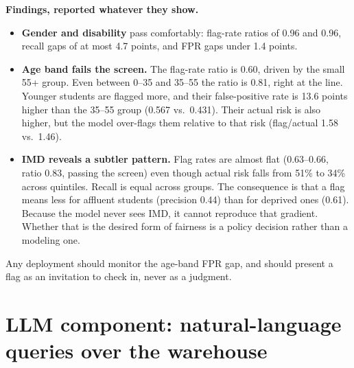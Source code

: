 \documentclass[10pt,letterpaper]{article}
\begin{document}
\textbf{Findings, reported whatever they show.}
\begin{itemize}
\item \textbf{Gender and disability} pass comfortably: flag-rate ratios of 0.96 and 0.96, recall gaps of at most
4.7 points, and FPR gaps under 1.4 points.
\item \textbf{Age band fails the screen.} The flag-rate ratio is 0.60, driven by the small 55+ group. Even
between 0--35 and 35--55 the ratio is 0.81, right at the line. Younger students are flagged more, and their
false-positive rate is 13.6 points higher than the 35--55 group (0.567 vs.\ 0.431). Their actual risk is also
higher, but the model over-flags them relative to that risk (flag/actual 1.58 vs.\ 1.46).
\item \textbf{IMD reveals a subtler pattern.} Flag rates are almost flat (0.63--0.66, ratio 0.83, passing the
screen) even though actual risk falls from 51\% to 34\% across quintiles. Recall is equal across groups. The
consequence is that a flag means less for affluent students (precision 0.44) than for deprived ones (0.61).
Because the model never sees IMD, it cannot reproduce that gradient. Whether that is the desired form of fairness
is a policy decision rather than a modeling one.
\end{itemize}
Any deployment should monitor the age-band FPR gap, and should present a flag as an invitation to check in, never
as a judgment.

\section{LLM component: natural-language queries over the warehouse}\label{sec:llm}


\end{document}
